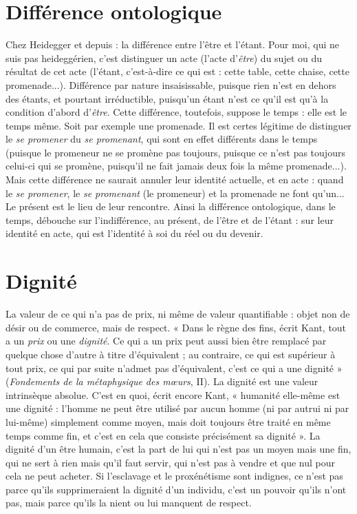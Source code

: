 \section{Différence ontologique}
Chez Heidegger et depuis : la différence
entre l’être et l’étant. Pour moi, qui ne
suis pas heideggérien, c’est distinguer un acte (l'acte d’{\it être}) du sujet ou du
résultat de cet acte (l’étant, c’est-à-dire ce qui est : cette table, cette chaise,
cette promenade...). Différence par nature insaisissable, puisque rien n’est en
dehors des étants, et pourtant irréductible, puisqu’un étant n’est ce qu’il est
qu'à la condition d’abord d’{\it être}. Cette différence, toutefois, suppose le
temps : elle est le temps même. Soit par exemple une promenade. Il est
certes légitime de distinguer le {\it se promener} du {\it se promenant}, qui sont en effet
différents dans le temps (puisque le promeneur ne se promène pas toujours,
puisque ce n’est pas toujours celui-ci qui se promène, puisqu'il ne fait jamais
deux fois la même promenade...). Mais cette différence ne saurait annuler
leur identité actuelle, et en acte : quand le {\it se promener}, le {\it se promenant} (le
promeneur) et la promenade ne font qu’un... Le présent est le lieu de leur
rencontre. Ainsi la différence ontologique, dans le temps, débouche sur l’indifférence,
au présent, de l’être et de l’étant : sur leur identité en acte, qui est
l'identité à soi du réel ou du devenir.

\section{Dignité}
La valeur de ce qui n’a pas de prix, ni même de valeur quantifiable :
objet non de désir ou de commerce, mais de respect.
« Dans le règne des fins, écrit Kant, tout a un {\it prix} ou une {\it dignité}. Ce qui a
un prix peut aussi bien être remplacé par quelque chose d’autre à titre
d’équivalent ; au contraire, ce qui est supérieur à tout prix, ce qui par suite
n’admet pas d’équivalent, c’est ce qui a une dignité » ({\it Fondements de la métaphysique
des mœurs}, II). La dignité est une valeur intrinsèque absolue. C’est en
quoi, écrit encore Kant, « humanité elle-même est une dignité : l'homme ne
peut être utilisé par aucun homme (ni par autrui ni par lui-même) simplement
comme moyen, mais doit toujours être traité en même temps comme fin, et
c’est en cela que consiste précisément sa dignité ». La dignité d’un être humain,
c’est la part de lui qui n’est pas un moyen mais une fin, qui ne sert à rien mais
qu'il faut servir, qui n’est pas à vendre et que nul pour cela ne peut acheter. Si
l'esclavage et le proxénétisme sont indignes, ce n’est pas parce qu’ils supprimeraient
la dignité d’un individu, c’est un pouvoir qu’ils n’ont pas, mais parce
qu’ils la nient ou lui manquent de respect.

